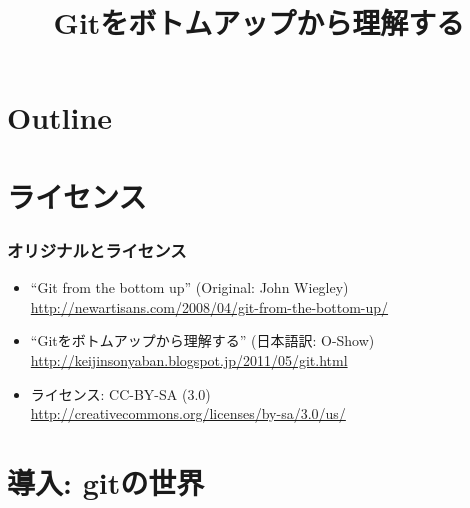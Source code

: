 \title{Gitをボトムアップから理解する}




\begin{frame}
  \titlepage
\end{frame}

\section*{Outline}
\begin{frame}
  \tableofcontents
\end{frame}

\section{ライセンス}

\begin{frame}
  \frametitle{オリジナルとライセンス}
  \begin{itemize}
  \item ``Git from the bottom up'' (Original: John Wiegley)\\
    \url{http://newartisans.com/2008/04/git-from-the-bottom-up/}
  \item ``Gitをボトムアップから理解する'' (日本語訳: O-Show)\\
    \url{http://keijinsonyaban.blogspot.jp/2011/05/git.html}
  \item ライセンス: CC-BY-SA (3.0) \\
    \url{http://creativecommons.org/licenses/by-sa/3.0/us/}
  \end{itemize}
\end{frame}

\section{導入: gitの世界}

